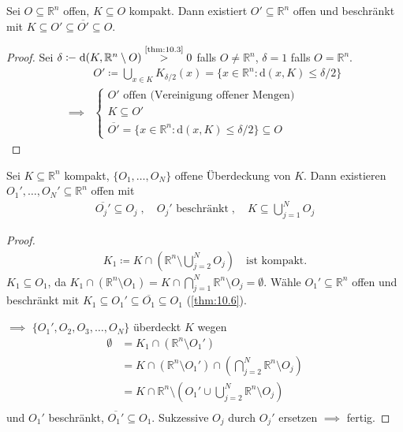 \begin{theorem}[Satz] \label{thm:10.6}
  Sei $O \subseteq \mathbb{R}^n$ offen, $K \subseteq O$ kompakt. Dann existiert $O' \subseteq \mathbb{R}^n$ offen und beschränkt mit $K \subseteq O' \subseteq \overline{O'} \subseteq O$.
  
  \begin{proof}
    Sei $\delta \coloneq \mathrm{d}(K,\mathbb{R}^n \setminus O) \overset{\text{\ref{thm:10.3}}}{>} 0$ falls $O \neq \mathbb{R}^n$, $\delta = 1$ falls $O = \mathbb{R}^n$.
    \begin{align*}
      & O' \coloneq \bigcup\limits_{x \in K} K_{\delta/2}(x) = \{ x \in \mathbb{R}^n : \mathrm{d}(x,K) \leq \delta/2 \} \\
      \implies &
      \begin{cases}
        O' \text{ offen (Vereinigung offener Mengen)} \\
        K \subseteq O' \\
        \overline{O'} = \{ x \in \mathbb{R}^n : \mathrm{d}(x,K) \leq \delta/2 \} \subseteq O
      \end{cases}
    \end{align*}
  \end{proof}
\end{theorem}

\begin{theorem}[Satz] \label{thm:10.7}
  Sei $K \subseteq \mathbb{R}^n$ kompakt, $\{ O_1,\ldots,O_N \}$ offene Überdeckung von $K$. Dann existieren $O_1',\ldots,O_N' \subseteq \mathbb{R}^n$ offen mit 
  \begin{align*}
    \overline{O_j'} \subseteq O_j \; , \quad O_j' \text{ beschränkt} \; , \quad K \subseteq \bigcup\limits_{j=1}^{N} O_j
  \end{align*}
  
  \begin{proof}
    \begin{align*}
      K_1 \coloneq K \cap \left( \mathbb{R}^n \setminus \bigcup\limits_{j=2}^{N} O_j \right) \quad \text{ist kompakt.}
    \end{align*}
    $K_1 \subseteq O_1$, da $K_1 \cap (\mathbb{R}^n \setminus O_1) = K \cap \bigcap\limits_{j=1}^{N} \mathbb{R}^n \setminus O_j = \emptyset$. Wähle $O_1' \subseteq \mathbb{R}^n$ offen und beschränkt mit $K_1 \subseteq O_1' \subseteq \overline{O_1} \subseteq O_1$ (\ref{thm:10.6}).
    
    $\implies$ $\{ O_1',O_2,O_3,\ldots,O_N \}$ überdeckt $K$ wegen
    \begin{align*}
      \emptyset
      &= K_1 \cap (\mathbb{R}^n \setminus O_1') \\
      &= K \cap (\mathbb{R}^n \setminus O_1') \cap \left( \bigcap\limits_{j=2}^{N} \mathbb{R}^n \setminus O_j \right) \\
      &= K \cap \mathbb{R}^n \setminus \left( O_1' \cup \bigcup\limits_{j=2}^{N} \mathbb{R}^n \setminus O_j \right) \\
    \end{align*}
    und $O_1'$ beschränkt, $\overline{O_1'} \subseteq O_1$. Sukzessive $O_j$ durch $O_j'$ ersetzen $\implies$ fertig.
  \end{proof}
\end{theorem}

